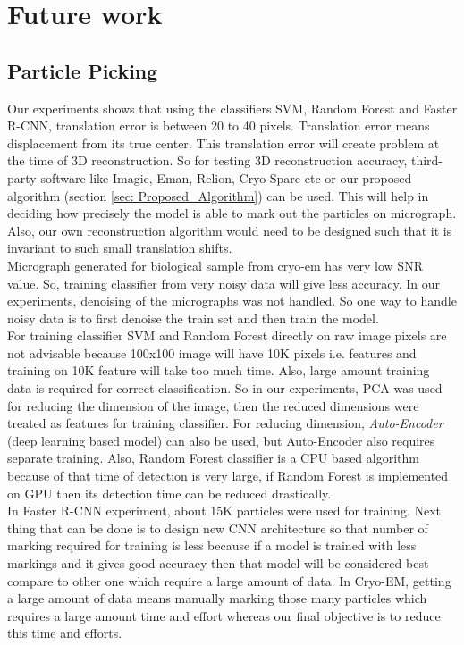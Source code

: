 \documentclass{report}
\begin{document}
\chapter{Future work}

\section{Particle Picking}
Our experiments shows that using the classifiers SVM, Random Forest and Faster R-CNN, translation error is between 20 to 40 pixels. Translation error means 
displacement from its true center. This translation error will create problem at the time of 3D reconstruction. So for testing 3D reconstruction accuracy, third-party software like Imagic, Eman, Relion, Cryo-Sparc etc or our proposed algorithm (section \ref{sec: Proposed_Algorithm}) can be used. This will help in deciding how precisely the model is able to mark out the particles on micrograph. Also, our own reconstruction algorithm would need to be designed such that it is invariant to such small translation shifts.\\

 Micrograph generated for biological sample from cryo-em has very low SNR value. So, training classifier from very noisy data will give less accuracy. In our experiments, denoising of the micrographs was not handled. So one way to handle noisy data is to first denoise the train set and then train the model. \\ 

For training classifier SVM and Random Forest directly on raw image pixels are not advisable because 100x100 image will have 10K pixels i.e. features and training on 10K feature will take too much time. Also, large amount training data is required for correct classification. So in our experiments, PCA was used for reducing the dimension of the image, then the reduced dimensions were treated as features for training classifier. For reducing dimension, \textit{Auto-Encoder}  (deep learning based model) \cite{meng2017relational} can also be used, but Auto-Encoder also requires separate training. Also, Random Forest classifier is a CPU based algorithm because of that time of detection is very large, if Random Forest is implemented on GPU then its detection time can be reduced drastically.\\

In Faster R-CNN experiment, about 15K particles were used for training. Next thing that can be done is to design new CNN architecture so that number of marking required for training is less because if a model is trained with less markings and it gives good accuracy then that model will be considered best compare to other one which require a large amount of data. In Cryo-EM, getting a large amount of data means manually marking those many particles which requires a large amount time and effort whereas our final objective is to reduce this time and efforts.\\
\end{document}
